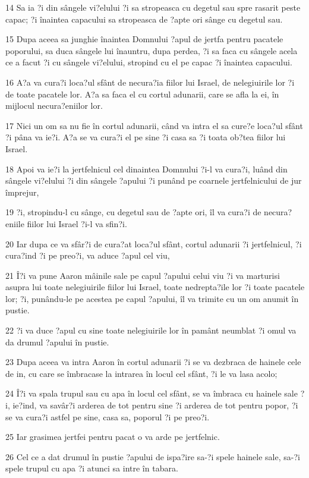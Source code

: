 \par 14 Sa ia ?i din sângele vi?elului ?i sa stropeasca cu degetul sau spre rasarit peste capac; ?i înaintea capacului sa stropeasca de ?apte ori sânge cu degetul sau.
\par 15 Dupa aceea sa junghie înaintea Domnului ?apul de jertfa pentru pacatele poporului, sa duca sângele lui înauntru, dupa perdea, ?i sa faca cu sângele acela ce a facut ?i cu sângele vi?elului, stropind cu el pe capac ?i înaintea capacului.
\par 16 A?a va cura?i loca?ul sfânt de necura?ia fiilor lui Israel, de nelegiuirile lor ?i de toate pacatele lor. A?a sa faca el cu cortul adunarii, care se afla la ei, în mijlocul necura?eniilor lor.
\par 17 Nici un om sa nu fie în cortul adunarii, când va intra el sa cure?e loca?ul sfânt ?i pâna va ie?i. A?a se va cura?i el pe sine ?i casa sa ?i toata ob?tea fiilor lui Israel.
\par 18 Apoi va ie?i la jertfelnicul cel dinaintea Domnului ?i-l va cura?i, luând din sângele vi?elului ?i din sângele ?apului ?i punând pe coarnele jertfelnicului de jur împrejur,
\par 19 ?i, stropindu-l cu sânge, cu degetul sau de ?apte ori, îl va cura?i de necura?eniile fiilor lui Israel ?i-l va sfin?i.
\par 20 Iar dupa ce va sfâr?i de cura?at loca?ul sfânt, cortul adunarii ?i jertfelnicul, ?i cura?ind ?i pe preo?i, va aduce ?apul cel viu,
\par 21 Î?i va pune Aaron mâinile sale pe capul ?apului celui viu ?i va marturisi asupra lui toate nelegiuirile fiilor lui Israel, toate nedrepta?ile lor ?i toate pacatele lor; ?i, punându-le pe acestea pe capul ?apului, îl va trimite cu un om anumit în pustie.
\par 22 ?i va duce ?apul cu sine toate nelegiuirile lor în pamânt neumblat ?i omul va da drumul ?apului în pustie.
\par 23 Dupa aceea va intra Aaron în cortul adunarii ?i se va dezbraca de hainele cele de in, cu care se îmbracase la intrarea în locul cel sfânt, ?i le va lasa acolo;
\par 24 Î?i va spala trupul sau cu apa în locul cel sfânt, se va îmbraca cu hainele sale ?i, ie?ind, va savâr?i arderea de tot pentru sine ?i arderea de tot pentru popor, ?i se va cura?i astfel pe sine, casa sa, poporul ?i pe preo?i.
\par 25 Iar grasimea jertfei pentru pacat o va arde pe jertfelnic.
\par 26 Cel ce a dat drumul în pustie ?apului de ispa?ire sa-?i spele hainele sale, sa-?i spele trupul cu apa ?i atunci sa intre în tabara.
